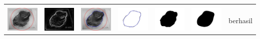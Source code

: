 \begin{table}[H]
\begin{tabular}{|m{0.7in}|m{0.7in}|m{0.7in}|m{0.7in}|m{0.7in}|m{0.7in}|m{0.7in}|}
		&  &  & & & &  \\
		\includegraphics[width=0.7in]{dataset/dataset_3/luka_hitam/ready/26_interp_init.jpg}&
		\includegraphics[width=0.7in]{dataset/dataset_3/luka_hitam/ready/26_interp_ext.jpg}&
		\includegraphics[width=0.7in]{dataset/dataset_3/luka_hitam/ready/26_interp_result.jpg}&
		\includegraphics[width=0.7in]{dataset/dataset_3/luka_hitam/ready/26_gt_r.jpg}&
		\includegraphics[width=0.7in]{dataset/dataset_3/luka_hitam/ready/26_r.jpg}&
		\includegraphics[width=0.7in]{dataset/dataset_3/luka_hitam/ready/26_interp_r.jpg}&
		berhasil\\
		\hline
		
	\end{tabular}
\end{table}

